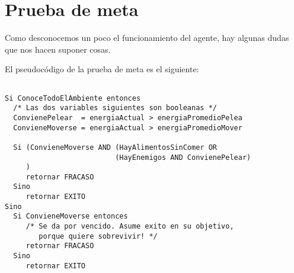 \section{Prueba de meta}

Como desconocemos un poco el funcionamiento del agente, hay algunas dudas que
nos hacen suponer cosas.

El pseudocódigo de la prueba de meta es el siguiente:

\begin{verbatim}

Si ConoceTodoElAmbiente entonces
  /* Las dos variables siguientes son booleanas */
  ConvienePelear  = energiaActual > energiaPromedioPelea
  ConvieneMoverse = energiaActual > energiaPromedioMover

  Si (ConvieneMoverse AND (HayAlimentosSinComer OR 
                          (HayEnemigos AND ConvienePelear) 
     )  
     retornar FRACASO
  Sino
     retornar EXITO
Sino
  Si ConvieneMoverse entonces
     /* Se da por vencido. Asume exito en su objetivo,
        porque quiere sobrevivir! */
     retornar FRACASO  
  Sino
     retornar EXITO

\end{verbatim}


